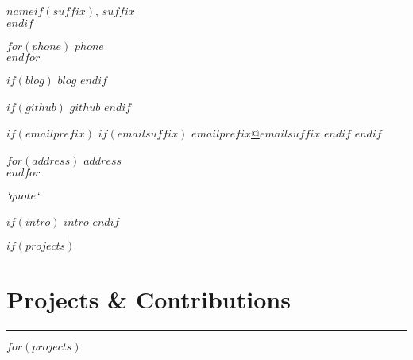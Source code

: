 \documentclass[$fontsize$, a4paper]{article}
\begin{document}
\begin{center}

	{\Huge $name$}$if(suffix)$,  {\large $suffix$}\\[.2cm]$endif$

	\begin{multicols}{3}
		$for(phone)$
		$phone$\\
		$endfor$
		\columnbreak

		$if(blog)$
		\href{http://$blog$}{{\FA \faRss}$blog$}
		$endif$

		$if(github)$
		\href{http://github.com/$github$}{{\FA \faGithub}$github$}
		$endif$

		$if(emailprefix)$
		$if(emailsuffix)$
		\href{mailto:$emailprefix$@$emailsuffix$}{{\FA \faEnvelope}$emailprefix$@$emailsuffix$}
		$endif$
		$endif$

		\columnbreak

		$for(address)$
		$address$\\
		$endfor$

	\end{multicols}

	{\emph{`$quote$`}}
\end{center}

$if(intro)$
$intro$
$endif$

\vspace{-25pt}


$if(projects)$
\section*{Projects \& Contributions}
\vspace{-20pt}
\rule{15cm}{0.04cm}%
\noindent
$for(projects)$
\end{document}

